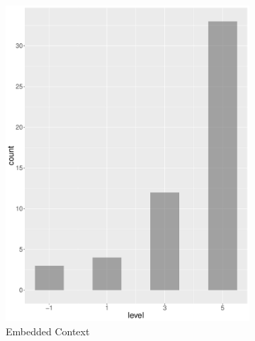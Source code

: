 \begin{figure}
\begin{subfigure}[b]{0.4\textwidth}
        \includegraphics[width=\textwidth]{plots/tennis/hist_level_ec}
        \caption{Embedded Context}
        \label{fig:hist_level_tennis_ec}
    \end{subfigure}
    ~
    \begin{subfigure}[b]{0.4\textwidth}

\end{subfigure}
\end{figure}
